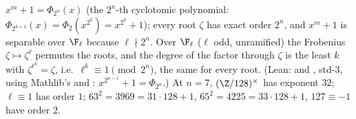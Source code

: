 $x^m+1=\Phi_{2^n}(x)$ (the $2^n$-th cyclotomic polynomial: $\Phi_{2^{k+1}}(x)=\Phi_2(x^{2^k})=x^{2^k}+1$); every root $\zeta$ has exact order $2^n$, and $x^m+1$ is separable over $\F_\ell$ because $\ell\nmid2^n$. Over $\F_\ell$ ($\ell$ odd, unramified) the Frobenius $\zeta\mapsto\zeta^\ell$ permutes the roots, and the degree of the factor through $\zeta$ is the least $k$ with $\zeta^{\ell^k}=\zeta$, i.e.\ $\ell^k\equiv1\pmod{2^n}$, the same for every root. (Lean:  and , std-3, using Mathlib's  and : $x^{2^{n-1}}+1=\Phi_{2^n}$.) At $n=7$, $(\Z/128)^\times$ has exponent $32$; $\ell\equiv1$ has order $1$; $63^2=3969=31\cdot128+1$, $65^2=4225=33\cdot128+1$, $127\equiv-1$ have order $2$.
